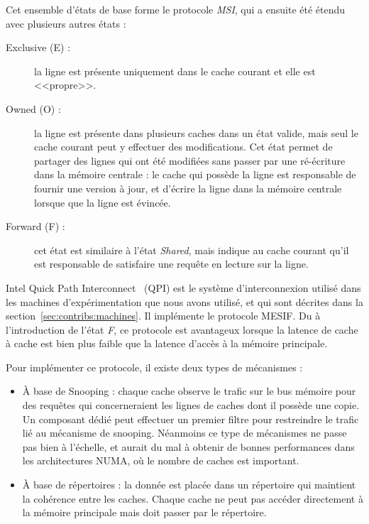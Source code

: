 Cet ensemble d'états de base forme le protocole \emph{MSI}, qui a ensuite été étendu avec plusieurs autres états :

\begin{description}
  \item [Exclusive (E) :] la ligne est présente uniquement dans le cache courant et elle est <<propre>>.
  \item [Owned (O) :] la ligne est présente dans plusieurs caches dans un état valide, mais seul le cache courant peut y effectuer des modifications.
    Cet état permet de partager des lignes qui ont été modifiées sans passer par une ré-écriture dans la mémoire centrale : le cache qui possède la ligne est responsable de fournir une version à jour, et d'écrire la ligne dans la mémoire centrale lorsque que la ligne est évincée.
  \item [Forward (F) :] cet état est similaire à l'état \emph{Shared}, mais indique au cache courant qu'il est responsable de satisfaire une requête en lecture sur la ligne.
\end{description}

Intel Quick Path Interconnect~\cite{Ziakas2010} (QPI) est le système d'interconnexion utilisé dans les machines d'expérimentation que nous avons utilisé, et qui sont décrites dans la section~\ref{sec:contribs:machines}.
Il implémente le protocole MESIF. Du à l'introduction de l'état \emph{F}, ce protocole est avantageux lorsque la latence de cache à cache est bien plus faible que la latence d'accès à la mémoire principale.

Pour implémenter ce protocole, il existe deux types de mécanismes :

\begin{itemize}
  \item À base de Snooping : chaque cache observe le trafic sur le bus mémoire pour des requêtes qui concerneraient les lignes de caches dont il possède une copie. Un composant dédié peut effectuer un premier filtre pour restreindre le trafic lié au mécanisme de snooping. Néanmoins ce type de mécanismes ne passe pas bien à l'échelle, et aurait du mal à obtenir de bonnes performances dans les architectures NUMA, où le nombre de caches est important.

  \item À base de répertoires : la donnée est placée dans un répertoire qui maintient la cohérence entre les caches. Chaque cache ne peut pas accéder directement à la mémoire principale mais doit passer par le répertoire.
\end{itemize}

